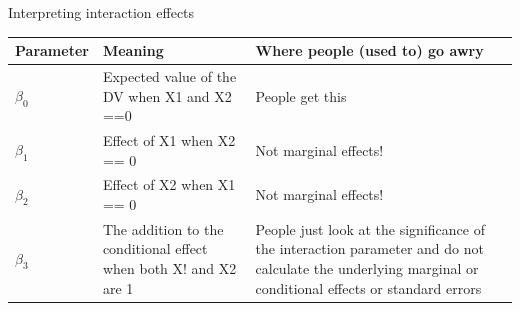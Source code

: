 \documentclass[australian,ignorenonframetext,aspectratio=169]{beamer}
\begin{document}
\begin{frame}{Interpreting interaction effects}
\protect\hypertarget{interpreting-interaction-effects}{}

\small

\begin{longtable}[]{@{}lll@{}}
\toprule
\begin{minipage}[b]{0.09\columnwidth}\raggedright
Parameter\strut
\end{minipage} & \begin{minipage}[b]{0.28\columnwidth}\raggedright
Meaning\strut
\end{minipage} & \begin{minipage}[b]{0.55\columnwidth}\raggedright
Where people (used to) go awry\strut
\end{minipage}\tabularnewline
\midrule
\endhead
\begin{minipage}[t]{0.09\columnwidth}\raggedright
\(\beta_0\)\strut
\end{minipage} & \begin{minipage}[t]{0.28\columnwidth}\raggedright
Expected value of the DV when X1 and X2 ==0\strut
\end{minipage} & \begin{minipage}[t]{0.55\columnwidth}\raggedright
People get this\strut
\end{minipage}\tabularnewline
\begin{minipage}[t]{0.09\columnwidth}\raggedright
\(\beta_1\)\strut
\end{minipage} & \begin{minipage}[t]{0.28\columnwidth}\raggedright
Effect of X1 when X2 == 0\strut
\end{minipage} & \begin{minipage}[t]{0.55\columnwidth}\raggedright
Not marginal effects!\strut
\end{minipage}\tabularnewline
\begin{minipage}[t]{0.09\columnwidth}\raggedright
\(\beta_2\)\strut
\end{minipage} & \begin{minipage}[t]{0.28\columnwidth}\raggedright
Effect of X2 when X1 == 0\strut
\end{minipage} & \begin{minipage}[t]{0.55\columnwidth}\raggedright
Not marginal effects!\strut
\end{minipage}\tabularnewline
\begin{minipage}[t]{0.09\columnwidth}\raggedright
\(\beta_3\)\strut
\end{minipage} & \begin{minipage}[t]{0.28\columnwidth}\raggedright
The addition to the conditional effect when both X! and X2 are 1\strut
\end{minipage} & \begin{minipage}[t]{0.55\columnwidth}\raggedright
People just look at the significance of the interaction parameter and do
not calculate the underlying marginal or conditional effects or standard
errors\strut
\end{minipage}\tabularnewline
\bottomrule
\end{longtable}

\end{frame}
\end{document}

